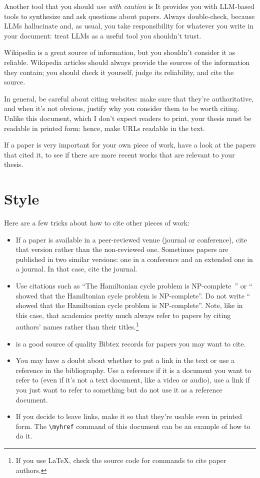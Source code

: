 Another tool that you should \emph{use with caution} is  It provides you with \ac{LLM}-based tools to synthesize and ask questions about papers. Always double-check, because \acp{LLM} hallucinate and, as usual, you take responsibility for whatever you write in your document: treat \acp{LLM} as a useful tool you shouldn't trust.

Wikipedia is a great source of information, but you shouldn't consider it as reliable.
Wikipedia articles should always provide the sources of the information they contain; you
should check it yourself, judge its reliability, and cite the source.

In general, be careful about citing websites: make sure that they're authoritative, and when it's not obvious, justify why you consider them to be worth citing. Unlike this document, which I don't expect readers to print, your thesis must be readable in printed form: hence, make URLs readable in the text.

If a paper is very important for your own piece of work, have a look at the papers
that cited it, to see if there are more recent works that are relevant to your thesis.

\section{Style}

Here are a few tricks about how to cite other pieces of work:
\begin{itemize}
  \item If a paper is available in a peer-reviewed venue (journal or conference), cite that
  version rather than the non-reviewed one. Sometimes papers are published in two similar
  versions: one in a conference and an extended one in a journal. In that case, cite the
  journal.
  \item Use citations such as ``The Hamiltonian cycle problem is
  NP-complete~\cite{DBLP:conf/coco/Karp72}'' or ``\textcite{DBLP:conf/coco/Karp72} showed
  that the Hamiltonian cycle problem is NP-complete''. Do not write
  ``\cite{DBLP:conf/coco/Karp72} showed that the Hamiltonian cycle problem is NP-complete''. Note, like in this case, that academics pretty much always refer to papers by citing authors' names rather than their titles.\footnote{If you use \LaTeX, check the source code for commands to cite paper authors.}
  \item {} is a good source of quality Bibtex records for papers
  you may want to cite.
  \item You may have a doubt about whether to put a link in the text or use a reference in the bibliography. Use a reference if it is a document you want to refer to (even if it's not a text document, like a video or audio), use a link if you just want to refer to something but do not use it as a reference document.
  \item If you decide to leave links, make it so that they're usable even in printed form. The \verb|\myhref| command of this document can be an example of how to do it.
\end{itemize}
